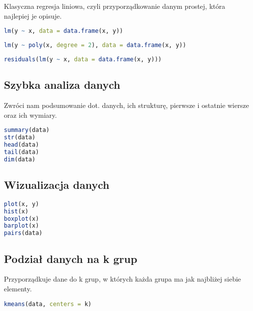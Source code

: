 \documentclass{../notatki}
\begin{document}
Klasyczna regresja liniowa, czyli przyporządkowanie danym prostej, która
najlepiej je opisuje.

\begin{lstlisting}[language=R, caption=regresja liniowa]
lm(y ~ x, data = data.frame(x, y))
\end{lstlisting}

\begin{lstlisting}[language=R, caption=regresja wielomianowa]
lm(y ~ poly(x, degree = 2), data = data.frame(x, y))
\end{lstlisting}

\begin{lstlisting}[language=R, caption=różnice pomiędzy danymi a ich
  regresją]
residuals(lm(y ~ x, data = data.frame(x, y)))
\end{lstlisting}

\subsection{Szybka analiza danych}

Zwróci nam podsumowanie dot. danych, ich strukturę, pierwsze i ostatnie
wiersze oraz ich wymiary.
\begin{lstlisting}[language=R, caption=szybka analiza danych]
summary(data)
str(data)
head(data)
tail(data)
dim(data)
\end{lstlisting}

\subsection{Wizualizacja danych}

\begin{lstlisting}[language=R, caption=wykresy]
plot(x, y)
hist(x)
boxplot(x)
barplot(x)
pairs(data)
\end{lstlisting}

\subsection{Podział danych na k grup}

Przyporządkuje dane do k grup, w których każda grupa ma
jak najbliżej siebie elementy.
\begin{lstlisting}[language=R, caption=podział danych na k grup]
kmeans(data, centers = k)
\end{lstlisting}
\end{document}
